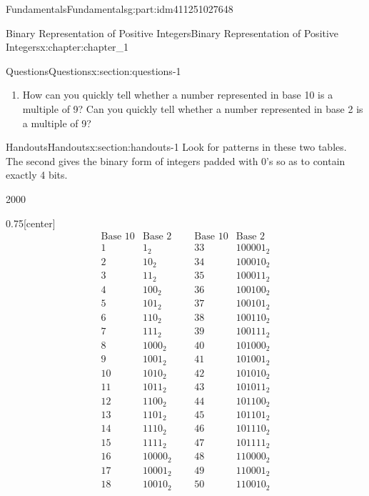 \documentclass[oneside,10pt,]{book}
\numberwithin{equation}{section}
\begin{document}
\begin{partptx}{Fundamentals}{}{Fundamentals}{}{}{g:part:idm411251027648}
\begin{chapterptx}{Binary Representation of Positive Integers}{}{Binary Representation of Positive Integers}{}{}{x:chapter:chapter_1}
\begin{sectionptx}{Questions}{}{Questions}{}{}{x:section:questions-1}
\begin{enumerate}[label=\arabic*.]
\item{}How can you quickly tell whether a number represented in base 10  is a multiple of 9?  Can you quickly tell whether a number represented in base 2  is a multiple of 9?%
\end{enumerate}
%
\end{sectionptx}
%
%
\typeout{************************************************}
\typeout{************************************************}
%
\begin{sectionptx}{Handouts}{}{Handouts}{}{}{x:section:handouts-1}
Look for patterns in these two tables. The second gives the binary form of integers padded with 0's so as to contain exactly 4 bits.%
\begin{sidebyside}{2}{0}{0}{0}%
\begin{sbspanel}{0.75}[center]%
%
\begin{equation*}
\begin{array}{ccccc}
\text{Base 10} & \text{Base
2} & \text{} & \text{Base
10} & \text{Base 2} \\
1 & 1_2 & \text{     } & 33 &
100001_2 \\
2 & 10_2 & \text{     } & 34
& 100010_2 \\
3 & 11_2 & \text{     } & 35
& 100011_2 \\
4 & 100_2 & \text{     } & 36
& 100100_2 \\
5 & 101_2 & \text{     } & 37
& 100101_2 \\
6 & 110_2 & \text{     } & 38
& 100110_2 \\
7 & 111_2 & \text{     } & 39
& 100111_2 \\
8 & 1000_2 & \text{     } &
40 & 101000_2 \\
9 & 1001_2 & \text{     } &
41 & 101001_2 \\
10 & 1010_2 & \text{     } &
42 & 101010_2 \\
11 & 1011_2 & \text{     } &
43 & 101011_2 \\
12 & 1100_2 & \text{     } &
44 & 101100_2 \\
13 & 1101_2 & \text{     } &
45 & 101101_2 \\
14 & 1110_2 & \text{     } &
46 & 101110_2 \\
15 & 1111_2 & \text{     } &
47 & 101111_2 \\
16 & 10000_2 & \text{     } &
48 & 110000_2 \\
17 & 10001_2 & \text{     } &
49 & 110001_2 \\
18 & 10010_2 & \text{     } &
50 & 110010_2 \\

\end{array}
\end{equation*}
\end{sbspanel}
\end{sidebyside}
\end{sectionptx}
\end{chapterptx}
\end{partptx}
\end{document}
